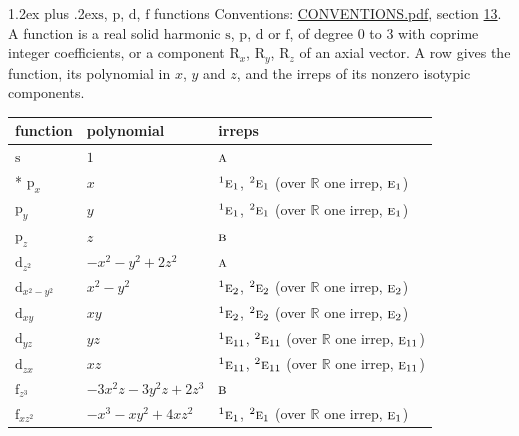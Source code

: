 \documentclass[10pt,a4paper]{article}
\makeatletter
\renewcommand\section{\@startsection{section}{1}{\z@}{-3ex plus -1ex minus -.2ex}%
  {1.2ex plus .2ex}{\normalfont\large\sffamily\bfseries\color{parttitle}}}
\numberwithin{equation}{section}
\newcommand{\irr}[1]{\text{\normalfont\scshape #1}}
\newcommand{\conjpair}[1]{{}^{#1}}
\newcommand{\orbital}[1]{\mathrm{#1}}
\makeatother
\begin{document}
\section{\texorpdfstring{$\orbital{s}$, $\orbital{p}$, $\orbital{d}$, $\orbital{f}$}{s, p, d, f} functions}\label{s:orbitals}
Conventions: \href{../../CONVENTIONS.pdf}{CONVENTIONS.pdf}, section \href{../../CONVENTIONS.pdf\#conv.13}{13}.
\leavevmode\label{n:head.function}A function is a real solid harmonic $\orbital{s}$, $\orbital{p}$, $\orbital{d}$ or $\orbital{f}$, of degree 0 to 3 with coprime integer coefficients, or a component $\orbital{R}_{x}$, $\orbital{R}_{y}$, $\orbital{R}_{z}$ of an axial vector. \label{n:head.polynomial}\label{n:head.irreps}A row gives the function, its polynomial in $x$, $y$ and $z$, and the irreps of its nonzero isotypic components.
{\small\begin{longtable}{@{}lll@{}}\toprule
function & polynomial & irreps\\\midrule\endhead
\bottomrule\endfoot\endlastfoot
$\orbital{s}$ & $1$ & $\irr{a}$\\*
$\orbital{p}_{x}$ & $x$ & $\conjpair{1}\irr{e}_{1}$, $\conjpair{2}\irr{e}_{1}$ (over $\mathbb{R}$ one irrep, $\irr{e}_{1}$)\\
$\orbital{p}_{y}$ & $y$ & $\conjpair{1}\irr{e}_{1}$, $\conjpair{2}\irr{e}_{1}$ (over $\mathbb{R}$ one irrep, $\irr{e}_{1}$)\\
$\orbital{p}_{z}$ & $z$ & $\irr{b}$\\
$\orbital{d}_{z^2}$ & $-x^{2} - y^{2} + 2z^{2}$ & $\irr{a}$\\
$\orbital{d}_{x^2-y^2}$ & $x^{2} - y^{2}$ & $\conjpair{1}\irr{e}_{2}$, $\conjpair{2}\irr{e}_{2}$ (over $\mathbb{R}$ one irrep, $\irr{e}_{2}$)\\
$\orbital{d}_{xy}$ & $xy$ & $\conjpair{1}\irr{e}_{2}$, $\conjpair{2}\irr{e}_{2}$ (over $\mathbb{R}$ one irrep, $\irr{e}_{2}$)\\
$\orbital{d}_{yz}$ & $yz$ & $\conjpair{1}\irr{e}_{11}$, $\conjpair{2}\irr{e}_{11}$ (over $\mathbb{R}$ one irrep, $\irr{e}_{11}$)\\
$\orbital{d}_{zx}$ & $xz$ & $\conjpair{1}\irr{e}_{11}$, $\conjpair{2}\irr{e}_{11}$ (over $\mathbb{R}$ one irrep, $\irr{e}_{11}$)\\
$\orbital{f}_{z^3}$ & $-3x^{2}z - 3y^{2}z + 2z^{3}$ & $\irr{b}$\\
$\orbital{f}_{xz^2}$ & $-x^{3} - xy^{2} + 4xz^{2}$ & $\conjpair{1}\irr{e}_{1}$, $\conjpair{2}\irr{e}_{1}$ (over $\mathbb{R}$ one irrep, $\irr{e}_{1}$)\\

\end{longtable}}
\end{document}
